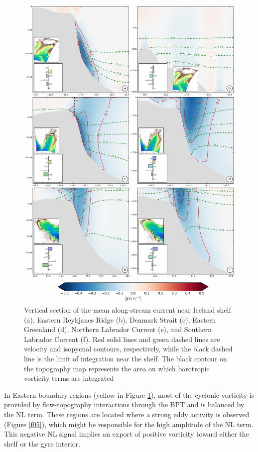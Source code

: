 \documentclass[os, manuscript]{copernicus}
\begin{document}
\begin{figure}[t]
\includegraphics[width=12cm]{../fig_os/f12.pdf}
\caption{Vertical section of the mean along-stream current near Iceland shelf (a), Eastern Reykjanes Ridge (b), Denmark Strait (c), Eastern Greenland (d), Northern Labrador Current (e), and Southern Labrador Current (f). Red solid lines and green dashed lines are velocity and isopycnal contours, respectively, while the black dashed line is the limit of integration near the shelf. The black contour on the topography map represents the area on which barotropic vorticity terms are integrated}
\label{f12}
\end{figure} 


In Eastern boundary regions (yellow in Figure \ref{f12}), most of the cyclonic vorticity is provided by flow-topography interactions through the BPT and is balanced by the NL term. These regions are located where a strong eddy activity is observed (Figure \ref{f05}), which might be responsible for the high amplitude of the NL term. This negative NL signal implies an export of positive vorticity toward either the shelf or the gyre interior. 
\end{document}
